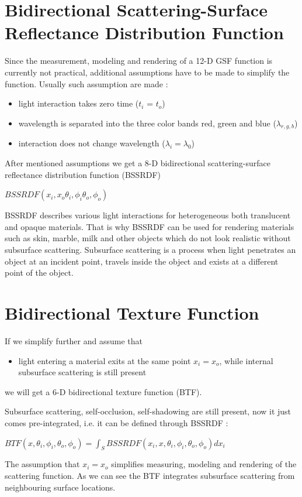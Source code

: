 \section{Bidirectional Scattering-Surface Reflectance Distribution Function}
\label{section:BSSRDF}
 Since the measurement, modeling and rendering of a 12-D GSF function is currently not practical, additional assumptions have to be made to simplify the function.
 Usually such assumption are made \cite{star2004}:

\begin{itemize}
 \item light interaction takes zero time ($t_{i}$  = $t_{o}$)
 \item wavelength is separated into the three color bands red, green and blue ($\lambda_{r,g,b}$)
 \item interaction does not change wavelength ($\lambda_{i}= \lambda_{0}$)
\end{itemize}

After mentioned assumptions we get a 8-D bidirectional scattering-surface reflectance distribution function (BSSRDF)
 \begin{center}
$BSSRDF(x_{i},x_{o}\theta_{i} ,\phi_{i}\theta_{o} ,\phi_{o})$
 \end{center}


BSSRDF describes various light interactions for heterogeneous both translucent and opaque materials.
That is why BSSRDF can be used for rendering materials such as skin, marble, milk and other objects which do not look realistic without subsurface scattering. 
Subsurface scattering is a process when light penetrates an object at an incident point, travels inside the object and exists at a different point of the object.

\section{Bidirectional Texture Function}
\label{section:btf}
If we simplify further and assume that

\begin{itemize}
 \item light entering a material exits at the same point $x_{i}=x_{o}$, while internal subsurface scattering is still present
\end{itemize}

we will get a 6-D bidirectional texture function (BTF).

Subsurface scattering, self-occlusion, self-shadowing  are still present, now it just comes pre-integrated, i.e. it can be defined through BSSRDF \cite{star2004}:
 \begin{center}
$ BTF(x,\theta_{i} ,\phi_{i},\theta_{o} ,\phi_{o})=\int_{S}BSSRDF(x_{i},x,\theta_{i} ,\phi_{i},\theta_{o} ,\phi_{o}) dx_{i}$
 \end{center}
  The assumption that $x_{i}=x_{o}$ simplifies measuring, modeling and rendering of the scattering function. 
 As we can see the BTF integrates subsurface scattering from neighbouring surface locations. 

